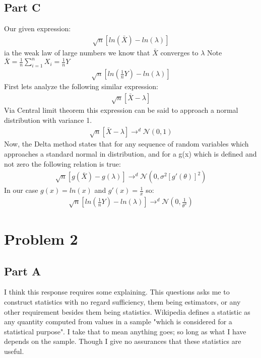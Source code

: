 \documentclass{article}
\begin{document}
\subsection*{Part C}
Our given expression:
\begin{align*}
\sqrt{n} [ln(\bar{X})-ln(\lambda)]
\end{align*}
ia the weak law of large numbers we know that $\bar{X}$ converges to $\lambda$
Note $\bar{X}=\frac{1}{n}\sum_{i=1}^{n}X_i = \frac{1}{n} Y$
\begin{align*}
\sqrt{n} [ln(\frac{1}{n} Y)-ln(\lambda)]
\end{align*}
First lets analyze the following similar expression:
\begin{align*}
\sqrt{n} [\bar{X}-\lambda]
\end{align*}
Via Central limit theorem this expression can be said to approach a normal distribution with variance 1.
\begin{align*}
\sqrt{n} [\bar{X}-\lambda] \rightarrow^d \mathcal{N}(0,1)
\end{align*}
Now, the Delta method states that for any sequence of random variables which approaches a standard normal in distribution, and for a g(x) which is defined and not zero the following relation is true:
\begin{align*}
\sqrt{n} [g(\bar{X})-g(\lambda)] \rightarrow^d \mathcal{N}(0,\sigma^2[g'(\theta)]^2)
\end{align*}
In our case $g(x) = ln(x)$ and $g'(x) = \frac{1}{x}$ so:
\begin{align*}
\boxed{ \sqrt{n} [ln(\frac{1}{n} Y)-ln(\lambda)] \rightarrow^d \mathcal{N}(0,\frac{1}{\theta^2}) }
\end{align*}
\clearpage
\section*{Problem 2}
\subsection*{Part A}
I think this response requires some explaining. This questions asks me to construct statistics with no regard sufficiency, them being estimators, or any other requirement besides them being statistics. Wikipedia defines a statistic as any quantity computed from values in a sample "which is considered for a statistical purpose". I take that to mean anything goes; so long as what I have depends on the sample. Though I give no assurances that these statistics are useful.
\end{document}
